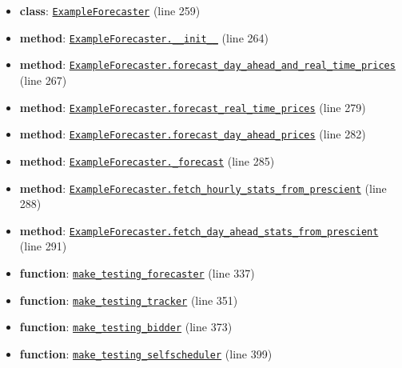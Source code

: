 \documentclass[11pt]{report}
\begin{document}
\begin{itemize}[leftmargin=*]
  \item \textbf{class}: \hyperref[def:tests-util.py:ExampleForecaster:L259]{\texttt{ExampleForecaster}} (line 259)
  \item \textbf{method}: \hyperref[def:tests-util.py:ExampleForecaster.__init__:L264]{\texttt{ExampleForecaster.\_\_init\_\_}} (line 264)
  \item \textbf{method}: \hyperref[def:tests-util.py:ExampleForecaster.forecast_day_ahead_and_real_time_prices:L267]{\texttt{ExampleForecaster.forecast\_day\_ahead\_and\_real\_time\_prices}} (line 267)
  \item \textbf{method}: \hyperref[def:tests-util.py:ExampleForecaster.forecast_real_time_prices:L279]{\texttt{ExampleForecaster.forecast\_real\_time\_prices}} (line 279)
  \item \textbf{method}: \hyperref[def:tests-util.py:ExampleForecaster.forecast_day_ahead_prices:L282]{\texttt{ExampleForecaster.forecast\_day\_ahead\_prices}} (line 282)
  \item \textbf{method}: \hyperref[def:tests-util.py:ExampleForecaster._forecast:L285]{\texttt{ExampleForecaster.\_forecast}} (line 285)
  \item \textbf{method}: \hyperref[def:tests-util.py:ExampleForecaster.fetch_hourly_stats_from_prescient:L288]{\texttt{ExampleForecaster.fetch\_hourly\_stats\_from\_prescient}} (line 288)
  \item \textbf{method}: \hyperref[def:tests-util.py:ExampleForecaster.fetch_day_ahead_stats_from_prescient:L291]{\texttt{ExampleForecaster.fetch\_day\_ahead\_stats\_from\_prescient}} (line 291)
  \item \textbf{function}: \hyperref[def:tests-util.py:make_testing_forecaster:L337]{\texttt{make\_testing\_forecaster}} (line 337)
  \item \textbf{function}: \hyperref[def:tests-util.py:make_testing_tracker:L351]{\texttt{make\_testing\_tracker}} (line 351)
  \item \textbf{function}: \hyperref[def:tests-util.py:make_testing_bidder:L373]{\texttt{make\_testing\_bidder}} (line 373)
  \item \textbf{function}: \hyperref[def:tests-util.py:make_testing_selfscheduler:L399]{\texttt{make\_testing\_selfscheduler}} (line 399)
\end{itemize}
\end{document}
